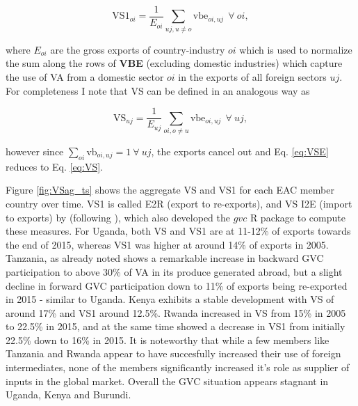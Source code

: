 \documentclass[a4paper]{article}
\begin{document}
\begin{equation} \label{eq:VS1}
\text{VS1}_{oi} = \frac{1}{E_{oi}} \sum_{uj, u \neq  o} \text{vbe}_{oi, uj}\ \ \forall\ oi,
\end{equation}

where $E_{oi}$ are the gross exports of country-industry $oi$ which is used to normalize the sum along the rows of \textbf{VBE} (excluding domestic industries) which capture the use of VA from a domestic sector $oi$ in the exports of all foreign sectors $uj$. For completeness I note that VS can be defined in an analogous way as

\begin{equation} \label{eq:VSE}
\text{VS}_{uj} = \frac{1}{E_{uj}} \sum_{oi, o \neq  u} \text{vbe}_{oi, uj}\ \ \forall\ uj,
\end{equation}

however since $\sum_{oi} \text{vb}_{oi, uj} = 1\ \forall\ uj$, the exports cancel out and Eq. \ref{eq:VSE} reduces to Eq. \ref{eq:VS}. \newline

Figure \ref{fig:VSag_ts} shows the aggregate VS and VS1 for each EAC member country over time. VS1 is called E2R (export to re-exports), and VS I2E (import to exports) by \citet{Kummritz20162} (following \citet{baldwin2015supply}), which also developed the $gvc$ R package to compute these measures. For Uganda, both VS and VS1 are at 11-12\% of exports towards the end of 2015, whereas VS1 was higher at around 14\% of exports in 2005. Tanzania, as already noted shows a remarkable increase in backward GVC participation to above 30\% of VA in its produce generated abroad, but a slight decline in forward GVC participation down to 11\% of exports being re-exported in 2015 - similar to Uganda. Kenya exhibits a stable development with VS of around 17\% and VS1 around 12.5\%. Rwanda increased in VS from 15\% in 2005 to 22.5\% in 2015, and at the same time showed a decrease in VS1 from initially 22.5\% down to 16\% in 2015. It is noteworthy that while a few members like Tanzania and Rwanda appear to have succesfully increased their use of foreign intermediates, none of the members significantly increased it's role as supplier of inputs in the global market. Overall the GVC situation appears stagnant in Uganda, Kenya and Burundi. 

\end{document}
